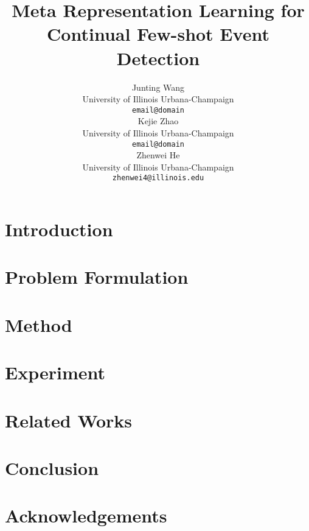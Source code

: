 \documentclass[11pt]{article}
\title{Meta Representation Learning for Continual Few-shot Event Detection}
\author{Junting Wang \\
  University of Illinois Urbana-Champaign \\
  \texttt{email@domain} \\\And
  Kejie Zhao \\
  University of Illinois Urbana-Champaign \\
  \texttt{email@domain} \\\And
  Zhenwei He \\
  University of Illinois Urbana-Champaign \\
  \texttt{zhenwei4@illinois.edu} \\}
\begin{document}
\maketitle\begin{abstract}

\end{abstract}


\section{Introduction}
\label{sec:introduction}



\section{Problem Formulation}
\label{sec:formulation}




\section{Method}
\label{sec:method}



\section{Experiment }
\label{sec:experiment}



\section{Related Works}
\label{sec:related_work}




\section{Conclusion}
\label{sec:conclusion}


%
%
%



\section{Acknowledgements}


\nocite{Ando2005,borschinger-johnson-2011-particle,andrew2007scalable,rasooli-tetrault-2015,goodman-etal-2016-noise,harper-2014-learning}


\appendix
\end{document}
